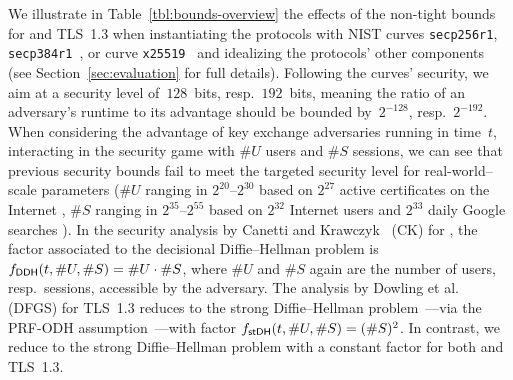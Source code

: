We illustrate in Table~\ref{tbl:bounds-overview} the effects of the non-tight bounds for \SIGMA and TLS~1.3
when instantiating the protocols with NIST curves \texttt{secp256r1}, \texttt{secp384r1}~\cite{NIST:FIPS-186-4}, or curve \texttt{x25519}~\cite{rfc7748} and idealizing the protocols' other components (see Section~\ref{sec:evaluation} for full details).
Following the curves' security, we aim at a security level of~$128$~bits, resp.~$192$~bits, meaning the ratio of an adversary's runtime to its advantage should be bounded by~$2^{-128}$, resp.~$2^{-192}$.
When considering the advantage of key exchange adversaries running in time~$t$, interacting in the security game with $\#U$ users and $\#S$ sessions,
we can see that previous security bounds fail to meet the targeted security level
for real-world--scale parameters ($\#U$ ranging in $2^{20}$--$2^{30}$ based on $2^{27}$ active certificates on the Internet%
, $\#S$ ranging in $2^{35}$--$2^{55}$ based on $2^{32}$ Internet users and $2^{33}$ daily Google searches%
).
In the security analysis by Canetti and Krawczyk~\cite{C:CanKra02} (CK) for \SIGMA, the factor associated to the decisional Diffie--Hellman problem is $f_{\mathsf{DDH}}(t,\#U,\#S) = \#U \cdot \#S$,
where $\#U$ and $\#S$ again are the number of users, resp.\ sessions, accessible by the adversary.
The analysis by Dowling et al.~\cite{JC:DFGS21} (DFGS) for TLS~1.3 reduces to the strong Diffie--Hellman problem~\cite{RSA:AbdBelRog01}---via the PRF-ODH assumption~\cite{C:JKSS12,C:BFGJ17}---with factor $f_{\mathsf{stDH}}(t,\#U,\#S) = (\#S)^2$.
In contrast, we reduce to the strong Diffie--Hellman problem with a constant factor for both \SIGMA and TLS~1.3.

